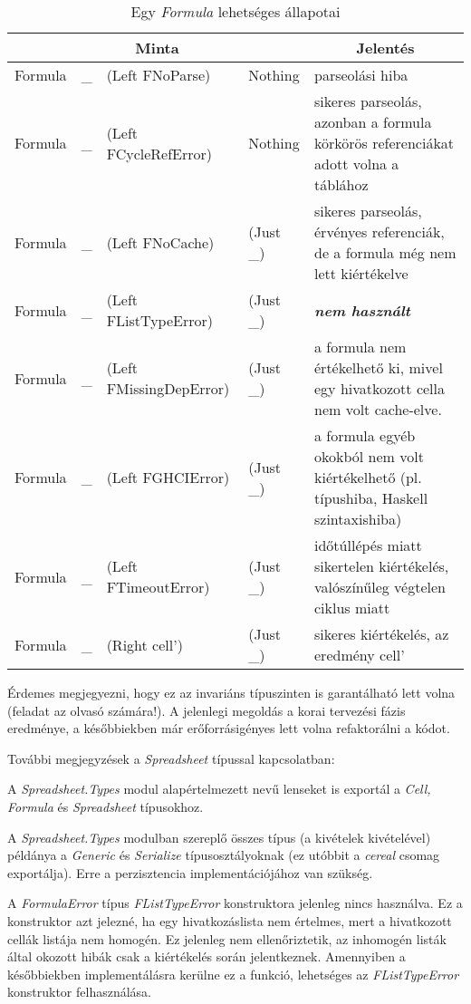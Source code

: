 \begin{table}
	\centering
	\begin{tabularx}{\textwidth}{ |l l l l| X |}
		\hline
		\multicolumn{4}{|c|}{Minta} & \multicolumn{1}{|c|}{Jelentés} \\
		\hline\hline
		Formula & \_ & (Left FNoParse) & Nothing & parseolási hiba \\
		\hline
		Formula & \_ & (Left FCycleRefError) & Nothing & sikeres parseolás, azonban a formula körkörös referenciákat adott volna a táblához \\
		\hline
		Formula & \_ & (Left FNoCache) & (Just \_) & sikeres parseolás, érvényes referenciák, de a formula még nem lett kiértékelve \\
		\hline
		Formula & \_ & (Left FListTypeError) & (Just \_) & \textbf{\textit{nem használt}} \\
		\hline
		Formula & \_ & (Left FMissingDepError) & (Just \_) & a formula nem értékelhető ki, mivel egy hivatkozott cella nem volt cache-elve. \\
		\hline
		Formula & \_ & (Left FGHCIError) & (Just \_) & a formula egyéb okokból nem volt kiértékelhető (pl. típushiba, Haskell szintaxishiba) \\
		\hline
		Formula & \_ & (Left FTimeoutError) & (Just \_) & időtúllépés miatt sikertelen kiértékelés, valószínűleg végtelen ciklus miatt \\
		\hline
		Formula & \_ & (Right cell') & (Just \_) & sikeres kiértékelés, az eredmény cell' \\
		\hline 
	\end{tabularx}
	\caption[Egy \textit{Formula} lehetséges állapotai]{Egy \textit{Formula} lehetséges állapotai}
	\label{tab:formula}
\end{table}

Érdemes megjegyezni, hogy ez az invariáns típuszinten is garantálható lett volna (feladat az olvasó számára!). A jelenlegi megoldás a korai tervezési fázis eredménye, a későbbiekben már erőforrásigényes lett volna refaktorálni a kódot.   

További megjegyzések a \textit{Spreadsheet} típussal kapcsolatban:
\begin{compactenum}
	\item A \textit{Spreadsheet.Types} modul alapértelmezett nevű lenseket is exportál a \textit{Cell, Formula} és \textit{Spreadsheet} típusokhoz.
	\item A \textit{Spreadsheet.Types} modulban szereplő összes típus (a kivételek kivételével) példánya a \textit{Generic} és \textit{Serialize} típusosztályoknak (ez utóbbit a \textit{cereal} csomag exportálja). Erre a perzisztencia implementációjához van szükség.
	\item A \textit{FormulaError} típus \textit{FListTypeError} konstruktora jelenleg nincs használva. Ez a konstruktor azt jelezné, ha egy hivatkozáslista nem értelmes, mert a hivatkozott cellák listája nem homogén. Ez jelenleg nem ellenőriztetik, az inhomogén listák által okozott hibák csak a kiértékelés során jelentkeznek. Amennyiben a későbbiekben implementálásra kerülne ez a funkció, lehetséges az \textit{FListTypeError} konstruktor felhasználása.
\end{compactenum} 

